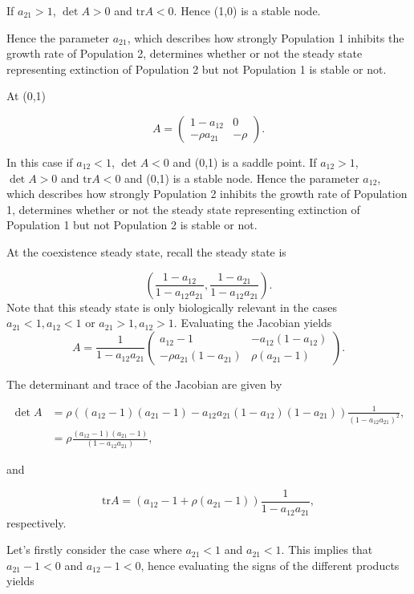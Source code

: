 \documentclass[
  letterpaper,
  DIV=11,
  numbers=noendperiod]{scrreprt}
\begin{document}
If \(a_{21}>1\), \(\det{A}>0\) and \(\mathrm{tr}{A}<0\). Hence (1,0) is
a stable node.

Hence the parameter \(a_{21}\), which describes how strongly Population
1 inhibits the growth rate of Population 2, determines whether or not
the steady state representing extinction of Population 2 but not
Population 1 is stable or not.

At (0,1)

\[
A=\left(\begin{array}{rr}
1-a_{12}& 0\\  -\rho a_{21} & -\rho \end{array}\right). 
\]

In this case if \(a_{12}<1\), \(\det{A}<0\) and (0,1) is a saddle point.
If \(a_{12}>1\), \(\det{A}>0\) and \(\mathrm{tr}{A}<0\) and (0,1) is a
stable node. Hence the parameter \(a_{12}\), which describes how
strongly Population 2 inhibits the growth rate of Population 1,
determines whether or not the steady state representing extinction of
Population 1 but not Population 2 is stable or not.

At the coexistence steady state, recall the steady state is

\[
\left(\frac{1-a_{12}}{1-a_{12}a_{21}},\frac{1-a_{21}}{1-a_{12}a_{21}}\right).
\] Note that this steady state is only biologically relevant in the
cases \(a_{21}<1, a_{12}<1\) or \(a_{21}>1, a_{12}>1\). Evaluating the
Jacobian yields \[
A=\frac{1}{1-a_{12}a_{21}}\left(\begin{array}{rr}
a_{12}-1  & -a_{12}(1-a_{12})\\ -\rho a_{21}(1-a_{21}) &\rho(a_{21}-1)\end{array}\right). 
\]

The determinant and trace of the Jacobian are given by

\[
\begin{aligned}
\det{A}&=\rho\left((a_{12}-1)(a_{21}-1)-a_{12}a_{21}(1-a_{12})(1-a_{21})\right)\frac{1}{(1-a_{12}a_{21})^2}, \nonumber \\
&= \rho\frac{(a_{12}-1)(a_{21}-1)}{(1-a_{12}a_{21})},
\end{aligned}
\]

and

\[
\mathrm{tr}{A}=\left(a_{12}-1+\rho(a_{21}-1)\right) \frac{1}{1-a_{12}a_{21}},
\] respectively.

Let's firstly consider the case where \(a_{21}<1\) and \(a_{21}<1\).
This implies that \(a_{21}-1<0\) and \(a_{12}-1<0\), hence evaluating
the signs of the different products yields
\end{document}
